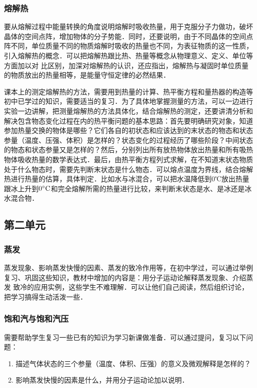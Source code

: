 \subsubsection{熔解热}

要从熔解过程中能量转换的角度说明熔解时吸收热量，用于克服分子力做功，破坏晶体的空间点阵，增加物体的分子势能．同时，还要说明，由于不同晶体的空间点阵不同，单位质量不同的物质熔解时吸收的热量也不同，为表征物质的这一性质，引入熔解热的概念．可以把熔解热跟比热、热量等概念从物理意义、定义、单位等方面加以对
比区别，加深对熔解热的认识，还应指出，熔解热与凝固时单位质量的物质放出的热量相等，是能量守恒定律的必然结果．

课本上的测定熔解热的方法，需要用到热量的计算、热平衡方程和量热器的构造等初中已学过的知识，需要适当的复习．为了具体地掌握测量的方法，可以一边进行实验一边讲解，把测量熔解热的方法具体化，结合熔解热的测定，还要讲清分析和解决包含物态变化过程在内的热平衡问题的基本思路：首先要明确研究对象，知道参加热量交换的物体是哪些？它们各自的初状态和应该达到的末状态的物态和状态参量（温度、压强、体积）是怎样的？状态变化的过程经历了哪些阶段？中间状态的物态和状态参量又是怎样的？然后，分别列出所有放热物体放出热量和所有吸热物体吸收热量的数学表达式．最后，由热平衡方程列式求解，在不知道末状态物质处于什么物态时，需要先判断末状态是什么物态．可以熔点温度为界线，结合熔解热进行热量的估算，具体判定．比如水与冰混合，可以把水温降低到0℃放出热量跟冰上升到$0^{\circ}{\rm C}$和完全熔解所需的热量进行比较，来判断末状态是水、是冰还是冰水混合物．

\subsection{第二单元}
\subsubsection{蒸发}

蒸发现象、影响蒸发快慢的因素、蒸发的致冷作用等，在初中学过，可以通过举例复习、巩固这些知识，教材中增加的内容是：用分子运动论解释蒸发现象、介绍蒸发
致冷的应用实例，这些学生不难理解．可以让他们自己阅读，然后组织讨论，把学习搞得生动活泼一些．

\subsubsection{饱和汽与饱和汽压}

需要帮助学生复习一些已有的知识为学习新课做准备．可以通过提问，复习以下问题：
\begin{enumerate}
\item 描述气体状态的三个参量（温度、体积、压强）的意义及微观解释是怎样的？
\item 影响蒸发快慢的因素是什么，并用分子运动论加以说明．
\end{enumerate}


